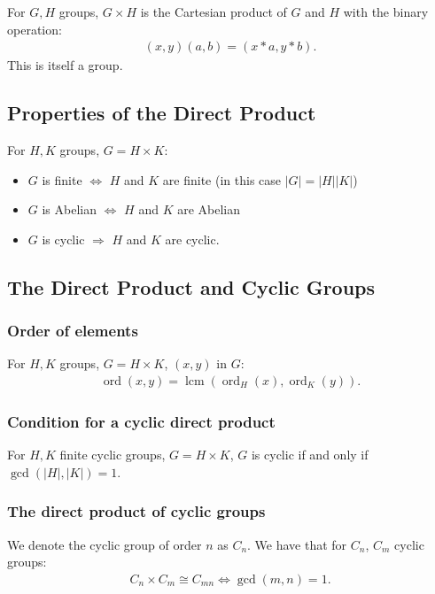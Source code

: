 \documentclass[a4paper, 12pt, twoside]{article}
\DeclareMathOperator{\Ord}{ord}
\DeclareMathOperator{\Gcd}{gcd}
\DeclareMathOperator{\Lcm}{lcm}
\begin{document}
For $G, H$ groups, $G \times H$ is the Cartesian product of $G$ and
$H$ with the binary operation:
\begin{align*}
      (x, y)(a, b) = (x * a, y * b). \tag{$\forall x, a \in G, y, b \in H$}
\end{align*}
This is itself a group.

\subsection{Properties of the Direct Product}

For $H, K$ groups, $G = H \times K$:

\begin{itemize}
      \item $G$ is finite $\Leftrightarrow$ $H$ and $K$ are finite
            (in this case $|G| = |H||K|$)
      \item $G$ is Abelian $\Leftrightarrow$ $H$ and $K$ are Abelian
      \item $G$ is cyclic $\Rightarrow$ $H$ and $K$ are cyclic.
\end{itemize}

\subsection{The Direct Product and Cyclic Groups}

\subsubsection{Order of elements}

For $H, K$ groups, $G = H \times K$, $(x, y)$ in $G$:
\begin{align*}
      \Ord(x, y) = \Lcm(\Ord_H(x), \Ord_K(y)).
\end{align*}

\subsubsection{Condition for a cyclic direct product}

For $H, K$ finite cyclic groups, $G = H \times K$, $G$ is cyclic if and only if
$\Gcd(|H|, |K|) = 1$.

\subsubsection{The direct product of cyclic groups}

We denote the cyclic group of order $n$ as $C_n$. We have that
for $C_n$, $C_m$ cyclic groups:
\begin{align*}
      C_n \times C_m \cong C_{mn} \Leftrightarrow \Gcd(m, n) = 1.
\end{align*}
\end{document}
